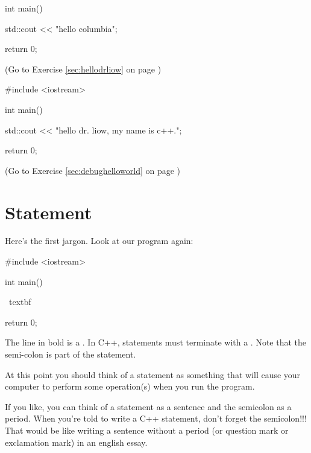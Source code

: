 \begin{console}[commandchars=\~\!\@]
\begin{soln}
\begin{console}
int main()
{
    std::cout << "hello columbia\n";

    return 0;
}
\end{console}
\end{soln}


\begin{soln}
\label{sec:hellodrliow_soln} 
(Go to Exercise \ref{sec:hellodrliow} 
on page \pageref{sec:hellodrliow})
\begin{console}
#include <iostream>

int main()
{
    std::cout << "hello dr. liow, my name is c++.\n";  
 
    return 0;   
}  
\end{console}   
\end{soln}  


\begin{soln} 
\label{sec:debughelloworld_soln} 
(Go to Exercise \ref{sec:debughelloworld} 
on page \pageref{sec:debughelloworld})
\end{soln}








\newpage\section{Statement}

Here's the first jargon. Look at our program again:
\begin{console}[commandchars=\~\%\@]
#include <iostream>

int main()
{
    ~textbf%

    return 0;
}
\end{console}

The line in bold is a 
. 
In C++, statements must terminate with a 
. 
Note that the semi-colon is part of the statement. 

At this point you should think of a statement as something that will cause 
your computer to perform some operation(s) when you run the program.

If you like, you can think of a statement as a sentence and the semicolon as a
period. When you're told to write a C++ statement, don't forget the 
semicolon!!! 
That would be like writing a sentence without a period (or question mark or 
exclamation mark) in an english essay.



\end{console}

